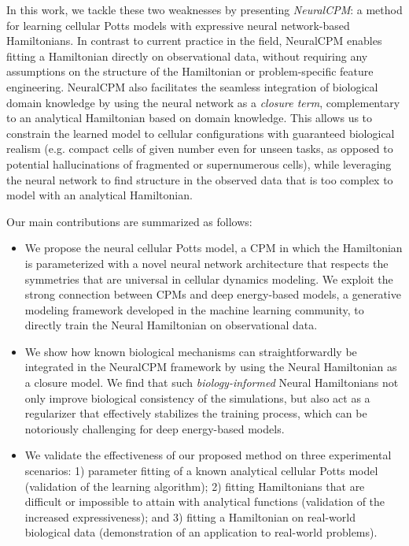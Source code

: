 In this work, we tackle these two weaknesses by presenting \emph{NeuralCPM}: a method for learning cellular Potts models with expressive neural network-based Hamiltonians. In contrast to current practice in the field, NeuralCPM enables fitting a Hamiltonian directly on observational data, without requiring any assumptions on the structure of the Hamiltonian or problem-specific feature engineering.
NeuralCPM also facilitates the seamless integration of biological domain knowledge by using the neural network as a \emph{closure term}, complementary to an analytical Hamiltonian based on domain knowledge. This allows us to constrain the learned model to cellular configurations with guaranteed biological realism (e.g. compact cells of given number even for unseen tasks, as opposed to potential hallucinations of fragmented or supernumerous cells), while leveraging the neural network to find structure in the observed data that is too complex to model with an analytical Hamiltonian.

Our main contributions are summarized as follows:
\begin{itemize}
    \item We propose the neural cellular Potts model, a CPM in which the Hamiltonian is parameterized with a novel neural network architecture that respects the symmetries that are universal in cellular dynamics modeling. We exploit the strong connection between CPMs and deep energy-based models, a generative modeling framework developed in the machine learning community, to directly train the Neural Hamiltonian on observational data.
    \item We show how known biological mechanisms can straightforwardly be integrated in the NeuralCPM framework by using the Neural Hamiltonian as a closure model. We find that such \emph{biology-informed} Neural Hamiltonians not only improve biological consistency of the simulations, but also act as a regularizer that effectively stabilizes the training process, which can be notoriously challenging for deep energy-based models.
    \item We validate the effectiveness of our proposed method on three experimental scenarios: 1) parameter fitting of a known analytical cellular Potts model (validation of the learning algorithm); 2) fitting Hamiltonians that are difficult or impossible to attain with analytical functions (validation of the increased expressiveness); and 3) fitting a Hamiltonian on real-world biological data (demonstration of an application to real-world problems).
\end{itemize}

